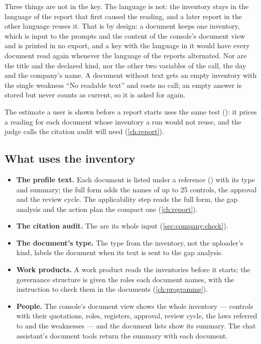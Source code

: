 Three things are not in the key. The language is not: the inventory stays in the language of
the report that first caused the reading, and a later report in the other language reuses it.
That is by design: a document keeps one inventory, which is input to the prompts and the
content of the console's document view and is printed in no export, and a key with the language
in it would have every document read again whenever the language of the reports alternated.
Nor are the title and the declared kind, nor the other two variables of the call, the day and
the company's name. A document without text gets an empty inventory with
the single weakness \enquote{No readable text} and costs no call; an empty answer is stored
but never counts as current, so it is asked for again.

The estimate a user is shown before a report starts uses the same test
(): it prices a reading for each document whose inventory a run
would not reuse, and the judge calls the citation audit will need (\cref{ch:report}).

\subsection{What uses the inventory}\label{sec:company:inventory-uses}

\begin{itemize}
  \item \textbf{The profile text.} Each document is listed under a reference (\code{[D1]})
    with its type and summary; the full form adds the names of up to 25 controls, the
    approval and the review cycle. The applicability step reads the full form, the gap
    analysis and the action plan the compact one (\cref{ch:report}).
  \item \textbf{The citation audit.} The  are its whole input
    (\cref{sec:company:check}).
  \item \textbf{The document's type.} The type from the inventory, not the uploader's kind,
    labels the document when its text is sent to the gap analysis.
  \item \textbf{Work products.} A work product reads the inventories before it starts; the
    governance structure is given the roles each document names, with the instruction to
    check them in the documents (\cref{ch:programme}).
  \item \textbf{People.} The console's document view shows the whole inventory --- controls
    with their quotations, roles, registers, approval, review cycle, the laws referred to and
    the weaknesses --- and the document lists show its summary. The chat assistant's document
    tools return the summary with each document.
\end{itemize}

